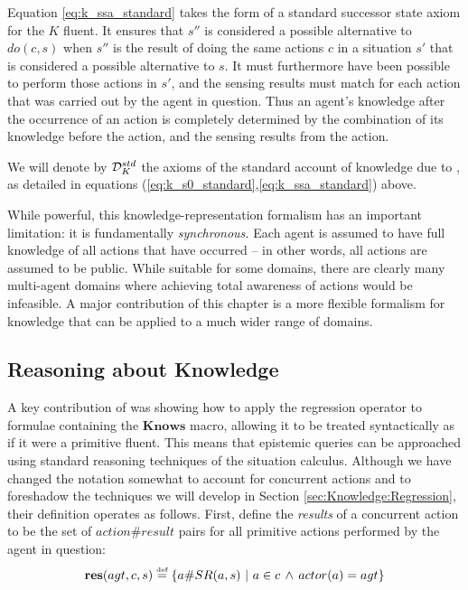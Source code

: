 Equation \eqref{eq:k_ssa_standard} takes the form of a standard successor
state axiom for the $K$ fluent. It ensures that $s''$ is considered
a possible alternative to $do(c,s)$ when $s''$ is the result of
doing the same actions $c$ in a situation $s'$ that is considered
a possible alternative to $s$. It must furthermore have been possible
to perform those actions in $s'$, and the sensing results must match
for each action that was carried out by the agent in question. Thus
an agent's knowledge after the occurrence of an action is completely
determined by the combination of its knowledge before the action,
and the sensing results from the action.

\medskip{}


\begin{defn}
We will denote by $\mathcal{D}_{K}^{std}$ the axioms of the standard account
of knowledge due to \citep{scherl03sc_knowledge,scherl03conc_knowledge},
as detailed in equations (\ref{eq:k_s0_standard},\ref{eq:k_ssa_standard})
above. 
\end{defn}
While powerful, this knowledge-representation formalism has an important
limitation: it is fundamentally \emph{synchronous.} Each agent is
assumed to have full knowledge of all actions that have occurred --
in other words, all actions are assumed to be public. While suitable
for some domains, there are clearly many multi-agent domains where
achieving total awareness of actions would be infeasible. A major
contribution of this chapter is a more flexible formalism for knowledge
that can be applied to a much wider range of domains.


\subsection{Reasoning about Knowledge}

A key contribution of \citet{scherl03sc_knowledge} was showing how
to apply the regression operator to formulae containing the $\mathbf{Knows}$
macro, allowing it to be treated syntactically as if it were a primitive
fluent. This means that epistemic queries can be approached using
standard reasoning techniques of the situation calculus. Although
we have changed the notation somewhat to account for concurrent actions
and to foreshadow the techniques we will develop in Section \ref{sec:Knowledge:Regression},
their definition operates as follows. First, define the \emph{results}
of a concurrent action to be the set of $action\#result$ pairs for
all primitive actions performed by the agent in question:\[
\mathbf{res}(agt,c,s)\stackrel{\mbox{\tiny def}}{=}\{a\#SR(a,s)\,\,|\,\, a\in c\,\wedge\, actor(a)=agt\}\]


